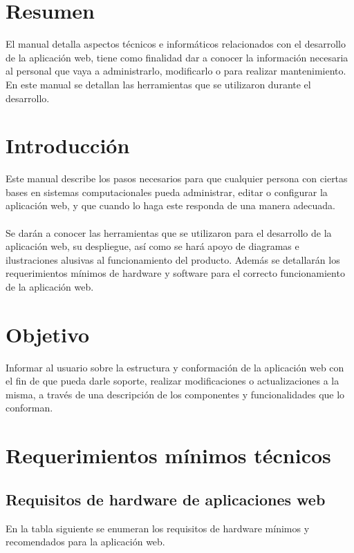 \documentclass[12pt, a4paper, titlepage]{article}
\begin{document}
	\section{Resumen}
	El manual detalla aspectos técnicos e informáticos relacionados con el desarrollo de la aplicación web, tiene como finalidad dar a conocer la información necesaria al personal que vaya a administrarlo, modificarlo o para realizar mantenimiento. En este manual se detallan las herramientas que se utilizaron durante el desarrollo. 
	\newpage
	\section{Introducción}
	Este manual describe los pasos necesarios para que cualquier persona con ciertas bases en sistemas computacionales pueda administrar, editar o configurar la aplicación web, y que cuando lo haga este responda de una manera adecuada.\\\\
	Se darán a conocer las herramientas que se utilizaron para el desarrollo de la aplicación web, su despliegue, así como se hará apoyo de diagramas e ilustraciones alusivas al funcionamiento del producto.	Además se detallarán los requerimientos mínimos de hardware y software para el correcto funcionamiento de la aplicación web.
	\section{Objetivo}
	Informar al usuario sobre la estructura y conformación de la aplicación web con el fin de que pueda darle soporte, realizar modificaciones o actualizaciones a la misma, a través de una descripción de los componentes y funcionalidades que lo conforman.
	\newpage
	\section{Requerimientos mínimos técnicos}
	\subsection{Requisitos de hardware de aplicaciones web}
	En la tabla siguiente se enumeran los requisitos
	de hardware mínimos y recomendados para la aplicación web.
	
\end{document}
